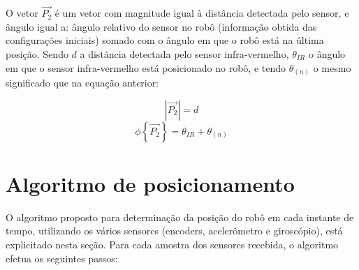 O vetor $\overrightarrow{P_2}$ é um vetor com magnitude igual à distância detectada pelo sensor, e ângulo igual a: ângulo relativo do sensor no robô (informação obtida das configurações iniciais) somado com o ângulo em que o robô está na última posição. Sendo $d$ a distãncia detectada pelo sensor infra-vermelho, $\theta_{IR}$ o ângulo em que o sensor infra-vermelho está posicionado no robô, e tendo $\theta_{(n)}$ o mesmo significado que na equação anterior:

\begin{equation}
  |\overrightarrow{P_2}| = d
  \label{eq:IR-P_2_modulo}
\end{equation}
\begin{equation}
  \phi \left\{ \overrightarrow{P_2} \right\} = \theta_{IR} + \theta_{(n)}
  \label{eq:IR-P_2_fase}
\end{equation}


%
\section{Algoritmo de posicionamento}

O algoritmo proposto para determinação da posição do robô em cada instante de tempo, utilizando os vários sensores (encoders, acelerômetro e giroscópio), está explicitado nesta seção. Para cada amostra dos sensores recebida, o algoritmo efetua os seguintes passos:

